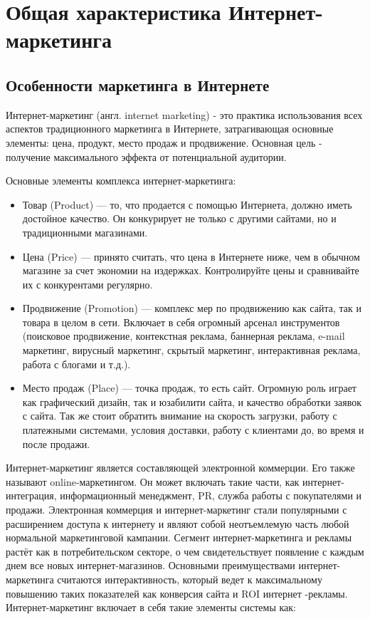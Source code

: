 \documentclass[a4paper,english,russian]{G2-105}
\begin{document}
\newpage

\chapter{Общая характеристика Интернет-маркетинга}
\section{Особенности маркетинга в Интернете}
\par Интернет-маркетинг (англ. internet marketing) - это практика использования всех аспектов традиционного маркетинга в Интернете, затрагивающая основные элементы: цена, продукт, место продаж и продвижение. Основная цель - получение максимального эффекта от потенциальной аудитории.
\par Основные элементы комплекса интернет-маркетинга:
\begin{itemize}
	\item Товар (Product) --- то, что продается с помощью Интернета, должно иметь достойное качество. Он 			конкурирует не только с другими сайтами, но и традиционными магазинами.
	
	\item Цена (Price) --- принято считать, что цена в Интернете ниже, чем в обычном магазине за счет 				экономии на издержках. Контролируйте цены и сравнивайте их с конкурентами регулярно.
	
	\item Продвижение (Promotion) --- комплекс мер по продвижению как сайта, так и товара в целом в сети. 			Включает в себя огромный арсенал инструментов (поисковое продвижение, контекстная реклама, баннерная 			реклама, e-mail маркетинг, вирусный маркетинг, скрытый маркетинг, интерактивная реклама, работа с 				блогами и т.д.).
	
	\item Место продаж (Place) --- точка продаж, то есть сайт. Огромную роль играет как графический дизайн, 			так и юзабилити сайта, и качество обработки заявок с сайта. Так же стоит обратить внимание на скорость 		загрузки, работу с платежными системами, условия доставки, работу с клиентами до, во время и после продажи.
\end{itemize}
\par Интернет-маркетинг является составляющей электронной коммерции. Его также называют online-маркетингом. Он может включать такие части, как интернет-интеграция, информационный менеджмент, PR, служба работы с покупателями и продажи. Электронная коммерция и интернет-маркетинг стали популярными с расширением доступа к интернету и являют собой неотъемлемую часть любой нормальной маркетинговой кампании. Сегмент интернет-маркетинга и рекламы растёт как в потребительском секторе, о чем свидетельствует появление с каждым днем все новых интернет-магазинов. Основными преимуществами интернет-маркетинга считаются интерактивность, который ведет к максимальному повышению таких показателей как конверсия сайта и ROI интернет -рекламы. Интернет-маркетинг включает в себя такие элементы системы как:
\end{document}
